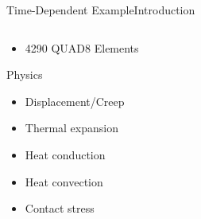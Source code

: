 \documentclass{beamer}
\begin{document}
\begin{frame}{Time-Dependent Example}{Introduction}
\begin{columns}
\begin{column}{0.5\textwidth}
\begin{itemize}
      \vfill
        \item 4290 QUAD8 Elements
      \end{itemize}
      \vfill
      Physics
      \begin{itemize}
        \item Displacement/Creep
        \item Thermal expansion
        \item Heat conduction
        \item Heat convection
        \item Contact stress
      \end{itemize}
    \end{column}
  \end{columns}
      \vfill
\end{frame}
\end{document}
